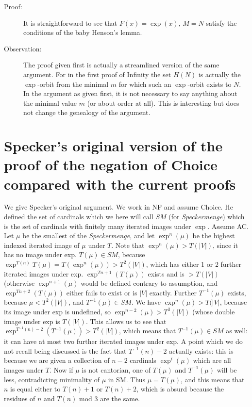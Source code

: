 \documentclass[12pt]{article}
\begin{document}
\begin{description}
 \item[Proof:]  It is straightforward to see that $F(x)=\exp(x)$, $M=N$ satisfy the conditions of the baby Henson's lemma.
 
 \item[Observation:]  The proof given first is actually a streamlined version of the same argument.  For in the first proof of Infinity the set $H(N)$ is actually
 the $\exp$-orbit from the minimal $m$ for which such an $\exp$-orbit exists to $N$.  In the argument as given first, it is not necessary to say anything about the minimal value $m$ (or about order at all).  This is interesting but does not change the genealogy of the argument.
 
 
 
 

\end{description}


\section{Specker's original version of the proof of the negation of Choice compared with the current proofs}

We give Specker's original argument.  We work in NF and assume Choice.  He defined the set of cardinals which we here will call $SM$ (for {\em Speckermenge\/}) which is the set of cardinals with finitely many iterated images under $\exp$.  Assume AC.  Let $\mu$ be the smallest of the {\em Speckermenge\/}, and let $\exp^n(\mu)$ be the highest indexed iterated image of $\mu$ under $T$.  Note that $\exp^n(\mu) > T(|V|)$, since it has no image under exp.  $T(\mu) \in SM$, because $\exp^{T(n)}{T(\mu)} = T(\exp^n(\mu)) > T^2(|V|)$, which has either 1 or 2 further iterated images under exp.
$\exp^{Tn+1}(T(\mu))$ exists and is $>T(|V|)$ (otherwise $\exp^{n+1}(\mu)$ would be defined contrary to assumption,
and $\exp^{Tn+2}(T(\mu))$ either fails to exist or is $|V|$ exactly.  Further $T^{-1}(\mu)$ exists, because $\mu<T^2(|V|)$,
and $T^{-1}(\mu) \in SM$.  We have $\exp^n(\mu)>T(|V|$, because its image under exp is undefined, so
$\exp^{n-2}(\mu)>T^3(|V|)$ (whose double image under exp is $T(|V|)$.  This allows us to see that
$\exp^{T^{-1}(n)-2}(T^{-1}(\mu))>T^2(|V|)$, which means that $T^{-1}(\mu)\in SM$ as well:  it can have at most two
further iterated images under exp.  A point which we do not recall being discussed is the fact that $T^{-1}(n)-2$ actually exists:  this is because we are given a collection of $n-2$ cardinals $\exp^i(\mu)$ which are all images under $T$.  Now if $\mu$ is not cantorian, one of $T(\mu)$ and $T^{-1}(\mu)$ will be less, contradicting minimality of $\mu$ in SM.  Thus $\mu=T(\mu)$, and this means that $n$ is equal either to $T(n)+1$ or $T(n)+2$, which is absurd because the residues of $n$ and $T(n)$ mod 3 are the same.
\end{document}

